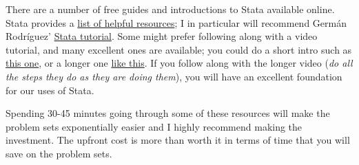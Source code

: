 \documentclass{article}
\begin{document}
There are a number of free guides and introductions to Stata available online. Stata provides a \href{https://www.stata.com/links/resources-for-learning-stata/}{list of helpful resources}; I in particular will recommend Germ\'an Rodr\'iguez' \href{https://grodri.github.io/stata/}{Stata tutorial}. Some might prefer following along with a video tutorial, and many excellent ones are available; you could do a short intro such as \href{https://www.youtube.com/watch?v=rdFw-fBfygQ&t=657s}{this one}, or a longer one \href{https://www.youtube.com/watch?v=gdnDkjoPJTM}{like this}. If you follow along with the longer video (\textit{do all the steps they do as they are doing them}), you will have an excellent foundation for our uses of Stata.

\vspace{2mm}

Spending 30-45 minutes going through some of these resources will make the problem sets exponentially easier and I highly recommend making the investment. The upfront cost is more than worth it in terms of time that you will save on the problem sets.
\end{document}
